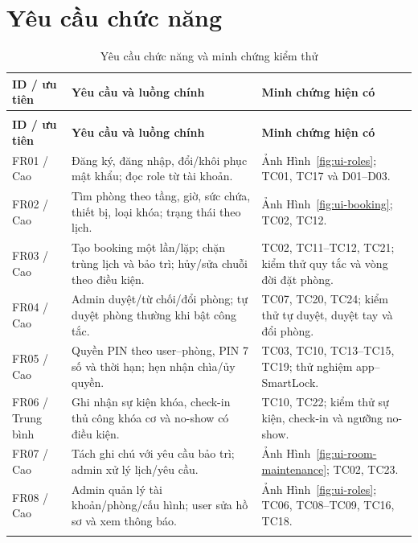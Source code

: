 \section{Yêu cầu chức năng}
{\tabletext\renewcommand{\arraystretch}{1.04}\begin{longtable}{>{\raggedright\arraybackslash}p{}>{\raggedright\arraybackslash}p{}>{\raggedright\arraybackslash}p{}}
\caption{Yêu cầu chức năng và minh chứng kiểm thử}\label{tab:fr}\\
\toprule \textbf{ID / ưu tiên} & \textbf{Yêu cầu và luồng chính} & \textbf{Minh chứng hiện có}\\\midrule
\endfirsthead
\multicolumn{3}{l}{\small Yêu cầu chức năng và minh chứng kiểm thử (tiếp)}\\
\toprule \textbf{ID / ưu tiên} & \textbf{Yêu cầu và luồng chính} & \textbf{Minh chứng hiện có}\\\midrule
\endhead
\bottomrule\endlastfoot
FR01 / Cao & Đăng ký, đăng nhập, đổi/khôi phục mật khẩu; đọc role từ tài khoản. & Ảnh Hình~\ref{fig:ui-roles}; TC01, TC17 và D01--D03.\\\addlinespace[1.5pt]
FR02 / Cao & Tìm phòng theo tầng, giờ, sức chứa, thiết bị, loại khóa; trạng thái theo lịch. & Ảnh Hình~\ref{fig:ui-booking}; TC02, TC12.\\\addlinespace[1.5pt]
FR03 / Cao & Tạo booking một lần/lặp; chặn trùng lịch và bảo trì; hủy/sửa chuỗi theo điều kiện. & TC02, TC11--TC12, TC21; kiểm thử quy tắc và vòng đời đặt phòng.\\\addlinespace[1.5pt]
FR04 / Cao & Admin duyệt/từ chối/đổi phòng; tự duyệt phòng thường khi bật công tắc. & TC07, TC20, TC24; kiểm thử tự duyệt, duyệt tay và đổi phòng.\\\addlinespace[1.5pt]
FR05 / Cao & Quyền PIN theo user--phòng, PIN 7 số và thời hạn; hẹn nhận chìa/ủy quyền. & TC03, TC10, TC13--TC15, TC19; thử nghiệm app--SmartLock.\\\addlinespace[1.5pt]
FR06 / Trung bình & Ghi nhận sự kiện khóa, check-in thủ công khóa cơ và no-show có điều kiện. & TC10, TC22; kiểm thử sự kiện, check-in và ngưỡng no-show.\\\addlinespace[1.5pt]
FR07 / Cao & Tách ghi chú với yêu cầu bảo trì; admin xử lý lịch/yêu cầu. & Ảnh Hình~\ref{fig:ui-room-maintenance}; TC02, TC23.\\\addlinespace[1.5pt]
FR08 / Cao & Admin quản lý tài khoản/phòng/cấu hình; user sửa hồ sơ và xem thông báo. & Ảnh Hình~\ref{fig:ui-roles}; TC06, TC08--TC09, TC16, TC18.\\\addlinespace[1.5pt]
\end{longtable}}

